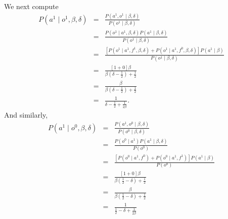 \documentclass{amsart}
\theoremstyle{definition}
\theoremstyle{plain}
\numberwithin{equation}{section}
\begin{document}
We next compute%
\begin{eqnarray*}
P\left( a^{1}\mid o^{1},\beta ,\delta \right)  &=&\frac{P\left(
a^{1},o^{1}\mid \beta ,\delta \right) }{P\left( o^{1}\mid \beta ,\delta
\right) } \\
&=&\frac{P\left( o^{1}\mid a^{1},\beta ,\delta \right) P\left( a^{1}\mid
\beta ,\delta \right) }{P\left( o^{1}\mid \beta ,\delta \right) } \\
&=&\frac{\left[ P\left( o^{1}\mid a^{1},f^{1},\beta ,\delta \right) +P\left(
o^{1}\mid a^{1},f^{0},\beta ,\delta \right) \right] P\left( a^{1}\mid \beta
\right) }{P\left( o^{1}\mid \beta ,\delta \right) } \\
&=&\frac{\left[ 1+0\right] \beta }{\beta \left( \delta -\frac{1}{2}\right) +%
\frac{1}{2}} \\
&=&\frac{\beta }{\beta \left( \delta -\frac{1}{2}\right) +\frac{1}{2}} \\
&=&\frac{1}{\delta -\frac{1}{2}+\frac{1}{2\beta }}.
\end{eqnarray*}%
And similarly,%
\begin{eqnarray*}
P\left( a^{1}\mid o^{0},\beta ,\delta \right)  &=&\frac{P\left(
a^{1},o^{0}\mid \beta ,\delta \right) }{P\left( o^{0}\mid \beta ,\delta
\right) } \\
&=&\frac{P\left( o^{0}\mid a^{1}\right) P\left( a^{1}\mid \beta ,\delta
\right) }{P\left( o^{0}\right) } \\
&=&\frac{\left[ P\left( o^{0}\mid a^{1},f^{0}\right) +P\left( o^{0}\mid
a^{1},f^{1}\right) \right] P\left( a^{1}\mid \beta \right) }{P\left(
o^{0}\right) } \\
&=&\frac{\left[ 1+0\right] \beta }{\beta \left( \frac{1}{2}-\delta \right) +%
\frac{1}{2}} \\
&=&\frac{\beta }{\beta \left( \frac{1}{2}-\delta \right) +\frac{1}{2}} \\
&=&\frac{1}{\frac{1}{2}-\delta +\frac{1}{2\beta }}
\end{eqnarray*}
\end{document}
